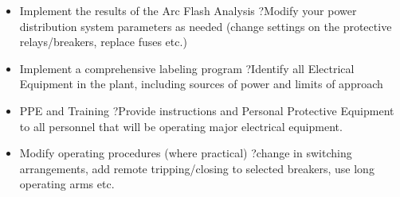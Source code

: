 \begin{itemize}
\item	Implement the results of the Arc Flash Analysis ?Modify your power distribution system parameters as needed (change settings on the protective relays/breakers, replace fuses etc.)
\\
\item	Implement a comprehensive labeling program ?Identify all Electrical Equipment in the plant, including sources of power and limits of approach  
\\
\item	PPE and Training ?Provide instructions and Personal Protective Equipment to all personnel that will be operating major electrical equipment.
\\
\item	Modify operating procedures (where practical) ?change in switching arrangements, add remote tripping/closing to selected breakers, use long operating arms etc.
\end{itemize}
